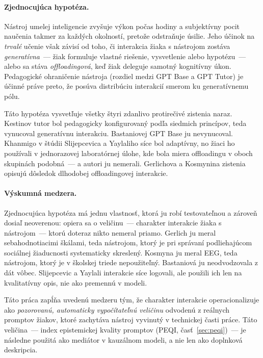 \paragraph{Zjednocujúca hypotéza.} Nástroj umelej inteligencie zvyšuje výkon počas hodiny a subjektívny pocit naučenia takmer za každých okolností, pretože odstraňuje úsilie. Jeho účinok na \emph{trvalé} učenie však závisí od toho, či interakcia žiaka s nástrojom zostáva \emph{generatívna}~--- žiak formuluje vlastné riešenie, vysvetlenie alebo hypotézu~--- alebo sa stáva \emph{offloadingová}, keď žiak deleguje samotný kognitívny úkon. Pedagogické ohraničenie nástroja (rozdiel medzi GPT Base a GPT Tutor) je účinné práve preto, že posúva distribúciu interakcií smerom ku generatívnemu pólu.

Táto hypotéza vysvetľuje všetky štyri zdanlivo protirečivé zistenia naraz. Kestinov tutor bol pedagogicky konfigurovaný podľa siedmich princípov, teda vynucoval generatívnu interakciu. Bastaniovej GPT Base ju nevynucoval. Khanmigo v štúdii Slijepcevica a Yaylaliho síce bol adaptívny, no žiaci ho používali v jednorazovej laboratórnej úlohe, kde bola miera offloadingu v oboch skupinách podobná~--- a autori ju nemerali. Gerlichova a Kosmynina zistenia opisujú dôsledok dlhodobej offloadingovej interakcie.

\paragraph{Výskumná medzera.} Zjednocujúca hypotéza má jednu vlastnosť, ktorá ju robí testovateľnou a zároveň dosiaľ neoverenou: opiera sa o veličinu~--- charakter interakcie žiaka s nástrojom~--- ktorú doteraz nikto nemeral priamo. Gerlich ju meral sebahodnotiacimi škálami, teda nástrojom, ktorý je pri správaní podliehajúcom sociálnej žiaducnosti systematicky skreslený. Kosmyna ju meral EEG, teda nástrojom, ktorý je v školskej triede nepoužiteľný. Bastaniová ju neodvodzovala z dát vôbec. Slijepcevic a Yaylali interakcie síce logovali, ale použili ich len na kvalitatívny opis, nie ako premennú v modeli.

Táto práca zapĺňa uvedenú medzeru tým, že charakter interakcie operacionalizuje ako \emph{pozorovanú, automaticky vypočítateľnú veličinu} odvodenú z reálnych promptov žiakov, ktoré zachytáva nástroj vyvinutý v technickej časti práce. Táto veličina~--- index epistemickej kvality promptov (PEQI, časť~\ref{sec:peqi})~--- je následne použitá ako mediátor v kauzálnom modeli, a nie len ako doplnková deskripcia.

